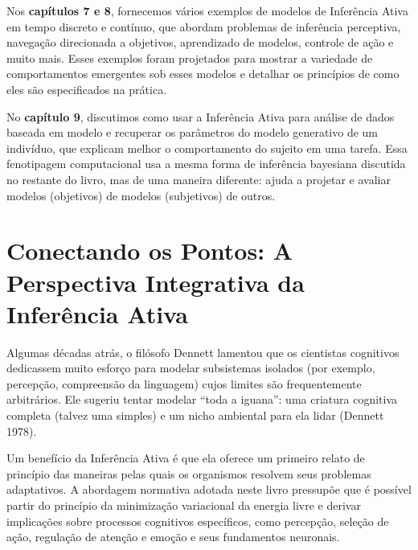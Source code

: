 \documentclass[
  12pt,
]{book}
\begin{document}
Nos \textbf{capítulos 7 e 8}, fornecemos vários exemplos de modelos de Inferência Ativa em tempo discreto e contínuo, que abordam problemas de inferência perceptiva, navegação direcionada a objetivos, aprendizado de modelos, controle de ação e muito mais. Esses exemplos foram projetados para mostrar a variedade de comportamentos emergentes sob esses modelos e detalhar os princípios de como eles são especificados na prática.

No \textbf{capítulo 9}, discutimos como usar a Inferência Ativa para análise de dados baseada em modelo e recuperar os parâmetros do modelo generativo de um indivíduo, que explicam melhor o comportamento do sujeito em uma tarefa. Essa fenotipagem computacional usa a mesma forma de inferência bayesiana discutida no restante do livro, mas de uma maneira diferente: ajuda a projetar e avaliar modelos (objetivos) de modelos (subjetivos) de outros.

\hypertarget{conectando-os-pontos-a-perspectiva-integrativa-da-inferuxeancia-ativa}{%
\section{Conectando os Pontos: A Perspectiva Integrativa da Inferência Ativa}\label{conectando-os-pontos-a-perspectiva-integrativa-da-inferuxeancia-ativa}}

Algumas décadas atrás, o filósofo Dennett lamentou que os cientistas cognitivos dedicassem muito esforço para modelar subsistemas isolados (por exemplo, percepção, compreensão da linguagem) cujos limites são frequentemente arbitrários. Ele sugeriu tentar modelar ``toda a iguana'': uma criatura cognitiva completa (talvez uma simples) e um nicho ambiental para ela lidar (Dennett 1978).

Um benefício da Inferência Ativa é que ela oferece um primeiro relato de princípio das maneiras pelas quais os organismos resolvem seus problemas adaptativos. A abordagem normativa adotada neste livro pressupõe que é possível partir do princípio da minimização variacional da energia livre e derivar implicações sobre processos cognitivos específicos, como percepção, seleção de ação, regulação de atenção e emoção e seus fundamentos neuronais.
\end{document}
